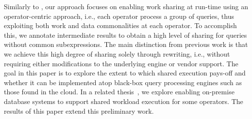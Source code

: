 Similarly to \cite{Candea:2009:SPJ:1687627.1687659, Arumugam:2010:DSD:1807167.1807224, Giannikis:2012:SKO:2168651.2168654, mqjoin}, our approach focuses on enabling
work sharing at run-time using an operator-centric approach, i.e., each operator process
a group of queries, thus exploiting both work and data commonalities at each operator.
To accomplish this, we annotate
intermediate results to obtain a high level of sharing for queries without
common subexpressions. 
The main distinction from previous work is that
we achieve this high degree of sharing solely through \sql rewriting, i.e.,
without requiring either modifications to the underlying engine or vendor
support. 
The goal in this paper is to explore the extent to which shared execution
pays-off and whether it can be implemented atop black-box query processing
engines such as those found in the cloud. 
In a related thesis~\cite{Wolf2017}, we explore enabling on-premise database
systems to support shared workload execution for some operators.  The results
of this paper extend this preliminary work.



